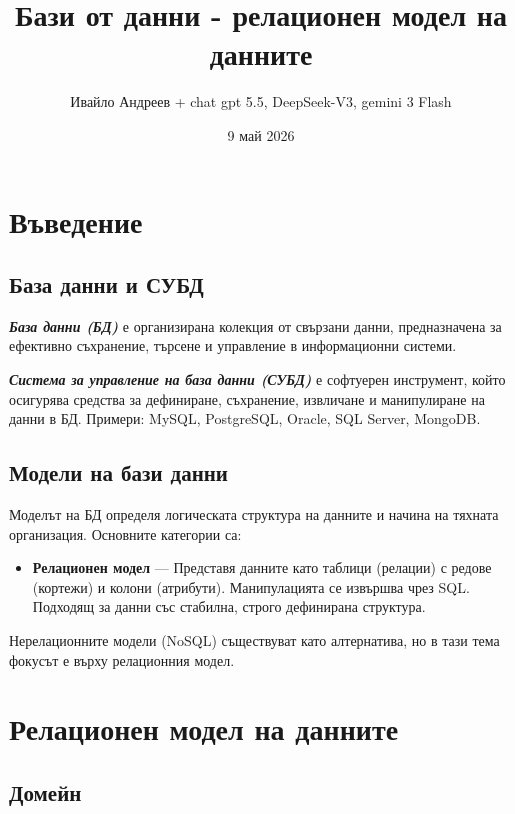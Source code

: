 \documentclass{scrartcl}
\title{Бази от данни - релационен модел на данните}
\author{Ивайло Андреев + chat gpt 5.5, DeepSeek-V3, gemini 3 Flash}
\date{9 май 2026}
\begin{document}
\maketitle

\tableofcontents
\newpage

\begin{FlushLeft}

\section{Въведение}

\subsection{База данни и СУБД}

\textbf{\textit{База данни (БД)}} е организирана колекция от свързани данни, предназначена за ефективно съхранение, търсене и управление в информационни системи.

\textbf{\textit{Система за управление на база данни (СУБД)}} е софтуерен инструмент, който осигурява средства за дефиниране, съхранение, извличане и манипулиране на данни в БД. Примери: MySQL, PostgreSQL, Oracle, SQL Server, MongoDB.

\subsection{Модели на бази данни}

Моделът на БД определя логическата структура на данните и начина на тяхната организация. Основните категории са:

\begin{itemize}
    \item \textbf{Релационен модел} --- Представя данните като таблици (релации) с редове (кортежи) и колони (атрибути). Манипулацията се извършва чрез SQL. Подходящ за данни със стабилна, строго дефинирана структура.
\end{itemize}

Нерелационните модели (NoSQL) съществуват като алтернатива, но в тази тема фокусът е върху релационния модел.

\section{Релационен модел на данните}

\subsection{Домейн}


\end{FlushLeft}
\end{document}
